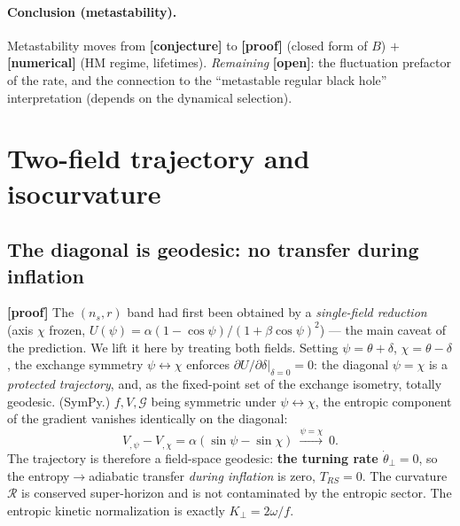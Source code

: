 \documentclass[11pt,a4paper]{article}
\newcommand{\st}[1]{\textbf{\textcolor{blue!45!black}{[#1]}}}
\begin{document}
\paragraph{Conclusion (metastability).} Metastability moves from \st{conjecture} to \st{proof} (closed form of $B$) $+$ \st{numerical} (HM regime, lifetimes). \emph{Remaining} \st{open}: the fluctuation prefactor of the rate, and the connection to the ``metastable regular black hole'' interpretation (depends on the dynamical selection).

\section{Two-field trajectory and isocurvature}\label{sec:A3}
\subsection{The diagonal is geodesic: no transfer during inflation}
\st{proof} The $(n_s,r)$ band had first been obtained by a \emph{single-field reduction} (axis $\chi$ frozen, $U(\psi)=\alpha(1-\cos\psi)/(1+\beta\cos\psi)^2$) --- the main caveat of the prediction. We lift it here by treating both fields. Setting $\psi=\theta+\delta$, $\chi=\theta-\delta$, the exchange symmetry $\psi\leftrightarrow\chi$ enforces $\partial U/\partial\delta|_{\delta=0}=0$: the diagonal $\psi=\chi$ is a \emph{protected trajectory}, and, as the fixed-point set of the exchange isometry, totally geodesic. (SymPy.) $f,V,\mathcal{G}$ being symmetric under $\psi\leftrightarrow\chi$, the entropic component of the gradient vanishes identically on the diagonal:
\begin{equation}
V_{,\psi}-V_{,\chi}=\alpha(\sin\psi-\sin\chi)\ \xrightarrow{\psi=\chi}\ 0. \tag{7}
\end{equation}
The trajectory is therefore a field-space geodesic: \textbf{the turning rate $\dot\theta_\perp=0$}, so the entropy$\to$adiabatic transfer \emph{during inflation} is zero, $T_{RS}=0$. The curvature $\mathcal{R}$ is conserved super-horizon and is not contaminated by the entropic sector. The entropic kinetic normalization is exactly $K_\perp=2\omega/f$.
\end{document}
